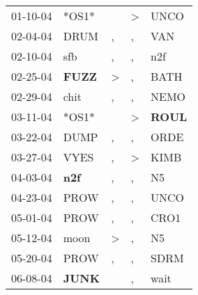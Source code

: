 \begin{supertabular}{p{0.07\textwidth}p{0.06\textwidth}p{0.02\textwidth}p{0.02\textwidth}p{0.06\textwidth}}
          01-10-04\textsuperscript{} &                            *OS1* &                  &     \textgreater &           UNCO\textsuperscript{} \\
          02-04-04\textsuperscript{} &           DRUM\textsuperscript{} &                , &                , &            VAN\textsuperscript{} \\
          02-10-04\textsuperscript{} &            sfb\textsuperscript{} &                , &                , &            n2f\textsuperscript{} \\
          02-25-04\textsuperscript{} &  \textbf{FUZZ\textsuperscript{}} &     \textgreater &                , &           BATH\textsuperscript{} \\
          02-29-04\textsuperscript{} &           chit\textsuperscript{} &                , &                , &           NEMO\textsuperscript{} \\
          03-11-04\textsuperscript{} &                            *OS1* &                  &     \textgreater &  \textbf{ROUL\textsuperscript{}} \\
          03-22-04\textsuperscript{} &           DUMP\textsuperscript{} &                , &                , &           ORDE\textsuperscript{} \\
          03-27-04\textsuperscript{} &           VYES\textsuperscript{} &                , &     \textgreater &           KIMB\textsuperscript{} \\
          04-03-04\textsuperscript{} &   \textbf{n2f\textsuperscript{}} &                , &                , &             N5\textsuperscript{} \\
          04-23-04\textsuperscript{} &           PROW\textsuperscript{} &                , &                , &           UNCO\textsuperscript{} \\
          05-01-04\textsuperscript{} &           PROW\textsuperscript{} &                , &                , &           CRO1\textsuperscript{} \\
          05-12-04\textsuperscript{} &           moon\textsuperscript{} &     \textgreater &                , &             N5\textsuperscript{} \\
          05-20-04\textsuperscript{} &           PROW\textsuperscript{} &                , &                , &           SDRM\textsuperscript{} \\
          06-08-04\textsuperscript{} &  \textbf{JUNK\textsuperscript{}} &                  &                , &           wait\textsuperscript{} \\

\end{supertabular}
